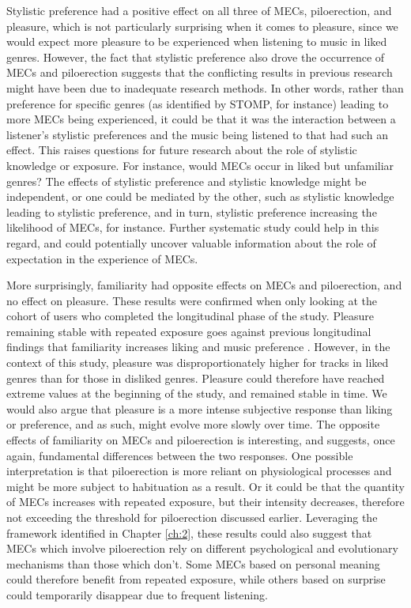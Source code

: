 Stylistic preference had a positive effect on all three of MECs, piloerection, and pleasure, which is not particularly surprising when it comes to pleasure, since we would expect more pleasure to be experienced when listening to music in liked genres. However, the fact that stylistic preference also drove the occurrence of MECs and piloerection suggests that the conflicting results in previous research might have been due to inadequate research methods. In other words, rather than preference for specific genres (as identified by STOMP, for instance) leading to more MECs being experienced, it could be that it was the interaction between a listener's stylistic preferences and the music being listened to that had such an effect. This raises questions for future research about the role of stylistic knowledge or exposure. For instance, would MECs occur in liked but unfamiliar genres? The effects of stylistic preference and stylistic knowledge might be independent, or one could be mediated by the other, such as stylistic knowledge leading to stylistic preference, and in turn, stylistic preference increasing the likelihood of MECs, for instance. Further systematic study could help in this regard, and could potentially uncover valuable information about the role of expectation in the experience of MECs.

More surprisingly, familiarity had opposite effects on MECs and piloerection, and no effect on pleasure. These results were confirmed when only looking at the cohort of users who completed the longitudinal phase of the study. Pleasure remaining stable with repeated exposure goes against previous longitudinal findings that familiarity increases liking and music preference \parencite{chmiel2019,madison2017}. However, in the context of this study, pleasure was disproportionately higher for tracks in liked genres than for those in disliked genres. Pleasure could therefore have reached extreme values at the beginning of the study, and remained stable in time. We would also argue that pleasure is a more intense subjective response than liking or preference, and as such, might evolve more slowly over time. The opposite effects of familiarity on MECs and piloerection is interesting, and suggests, once again, fundamental differences between the two responses. One possible interpretation is that piloerection is more reliant on physiological processes and might be more subject to habituation as a result. Or it could be that the quantity of MECs increases with repeated exposure, but their intensity decreases, therefore not exceeding the threshold for piloerection discussed earlier. Leveraging the framework identified in Chapter \ref{ch:2}, these results could also suggest that MECs which involve piloerection rely on different psychological and evolutionary mechanisms than those which don't. Some MECs based on personal meaning could therefore benefit from repeated exposure, while others based on surprise could temporarily disappear due to frequent listening.

